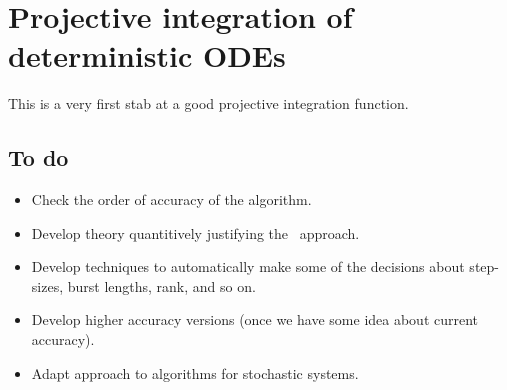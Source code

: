 \section{Projective integration of deterministic ODEs}
\label{sec:ProjInt}

This is a very first stab at a good projective integration function.





\subsection{To do}
\begin{itemize}
\item Check the order of accuracy of the algorithm.
\item Develop theory quantitively justifying the \dmd\ approach.
\item Develop techniques to automatically make some of the decisions about step-sizes, burst lengths, rank, and so on.
\item Develop higher accuracy versions (once we have some idea about current accuracy).
\item Adapt approach to algorithms for stochastic systems.
\end{itemize}


